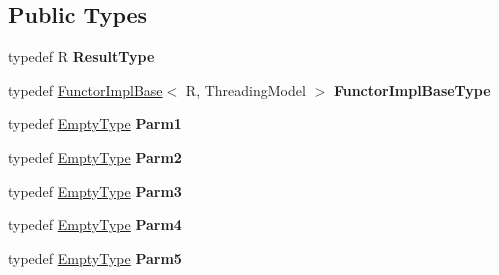 \subsection*{Public Types}
\begin{DoxyCompactItemize}
\item 
\hypertarget{structLoki_1_1Private_1_1FunctorImplBase_a7700e725abc0fc1acb44a6b848200d7f}{}typedef R {\bfseries Result\+Type}\label{structLoki_1_1Private_1_1FunctorImplBase_a7700e725abc0fc1acb44a6b848200d7f}

\item 
\hypertarget{structLoki_1_1Private_1_1FunctorImplBase_a70d2a2422a41e5a21d05de5dad5ff2d1}{}typedef \hyperlink{structLoki_1_1Private_1_1FunctorImplBase}{Functor\+Impl\+Base}$<$ R, Threading\+Model $>$ {\bfseries Functor\+Impl\+Base\+Type}\label{structLoki_1_1Private_1_1FunctorImplBase_a70d2a2422a41e5a21d05de5dad5ff2d1}

\item 
\hypertarget{structLoki_1_1Private_1_1FunctorImplBase_a40a797aebd5116aea391a506b384d2e8}{}typedef \hyperlink{classLoki_1_1EmptyType}{Empty\+Type} {\bfseries Parm1}\label{structLoki_1_1Private_1_1FunctorImplBase_a40a797aebd5116aea391a506b384d2e8}

\item 
\hypertarget{structLoki_1_1Private_1_1FunctorImplBase_aad2b2717217e6f925881dc1c245a4f94}{}typedef \hyperlink{classLoki_1_1EmptyType}{Empty\+Type} {\bfseries Parm2}\label{structLoki_1_1Private_1_1FunctorImplBase_aad2b2717217e6f925881dc1c245a4f94}

\item 
\hypertarget{structLoki_1_1Private_1_1FunctorImplBase_a0c86b68e354f8e575fde53d267392735}{}typedef \hyperlink{classLoki_1_1EmptyType}{Empty\+Type} {\bfseries Parm3}\label{structLoki_1_1Private_1_1FunctorImplBase_a0c86b68e354f8e575fde53d267392735}

\item 
\hypertarget{structLoki_1_1Private_1_1FunctorImplBase_a6c5f0ab7c6d7d864774338a964c94fe8}{}typedef \hyperlink{classLoki_1_1EmptyType}{Empty\+Type} {\bfseries Parm4}\label{structLoki_1_1Private_1_1FunctorImplBase_a6c5f0ab7c6d7d864774338a964c94fe8}

\item 
\hypertarget{structLoki_1_1Private_1_1FunctorImplBase_a2174bba6a8dda6aeb2705275c6d5ef29}{}typedef \hyperlink{classLoki_1_1EmptyType}{Empty\+Type} {\bfseries Parm5}\label{structLoki_1_1Private_1_1FunctorImplBase_a2174bba6a8dda6aeb2705275c6d5ef29}


\end{DoxyCompactItemize}
